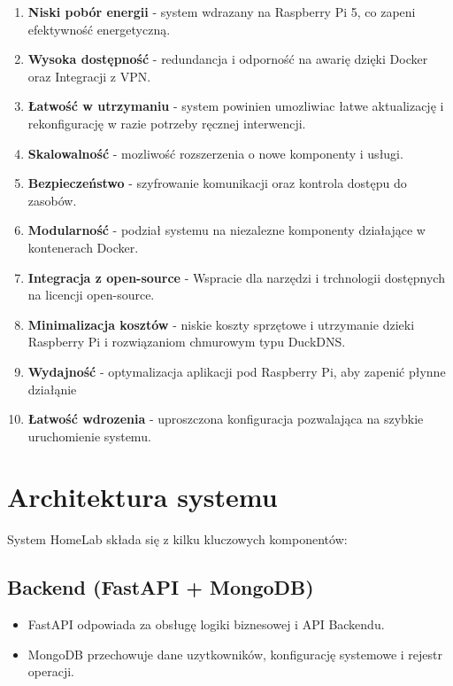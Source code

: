 \begin{enumerate}
    \item \textbf{Niski pobór energii} - system wdrazany na Raspberry Pi 5, co zapeni efektywność energetyczną.
    \item \textbf{Wysoka dostępność} - redundancja i odporność na awarię dzięki Docker oraz Integracji z VPN.
    \item \textbf{Łatwość w utrzymaniu} - system powinien umozliwiac łatwe aktualizację i rekonfigurację w razie potrzeby ręcznej interwencji.
    \item \textbf{Skalowalność} - mozliwość rozszerzenia o nowe komponenty i usługi.
    \item \textbf{Bezpieczeństwo} - szyfrowanie komunikacji oraz kontrola dostępu do zasobów.
    \item \textbf{Modularność} - podział systemu na niezalezne komponenty działające w kontenerach Docker.
    \item \textbf{Integracja z open-source} - Wspracie dla narzędzi i trchnologii dostępnych na licencji open-source.
    \item \textbf{Minimalizacja kosztów} - niskie koszty sprzętowe i utrzymanie dzieki Raspberry Pi i rozwiązaniom chmurowym typu DuckDNS.
    \item \textbf{Wydajność} - optymalizacja aplikacji pod Raspberry Pi, aby zapenić płynne działąnie 
    \item \textbf{Łatwość wdrozenia} - uproszczona konfiguracja pozwalająca na szybkie uruchomienie systemu.
\end{enumerate}

\pagebreak

\section{Architektura systemu}
System HomeLab składa się z kilku kluczowych komponentów:

\subsection{Backend (FastAPI + MongoDB)}
\begin{itemize}
    \item FastAPI \cite{FastAPI} odpowiada za obsługę logiki biznesowej i API Backendu.
    \item MongoDB \cite{MongoDB} przechowuje dane uzytkowników, konfigurację systemowe i rejestr operacji.
\end{itemize}


